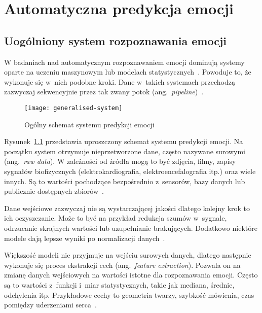 \chapter{Automatyczna predykcja emocji}
\label{ch:automatyczna-predykcja-emocji}

\section{Uogólniony system rozpoznawania emocji}
\label{sec:uogolniony-system-rozpoznawania-emocji}

W badaniach nad automatycznym rozpoznawaniem emocji dominują systemy oparte na uczeniu maszynowym lub modelach statystycznych~\cite{Varghese2015, Dzedzickis2020}.
Powoduje to, że wykonuje się w~nich podobne kroki.
Dane w~takich systemach przechodzą zazwyczaj sekwencyjnie przez tak zwany potok (ang.~\textit{pipeline})~\cite{Geron2019}.

\begin{figure}[h]
    \centering
    \texttt{[image: generalised-system]}
    \caption{Ogólny schemat systemu predykcji emocji}
    \label{fig:generalised-system}
\end{figure}

Rysunek~\ref{fig:generalised-system} przedstawia uproszczony schemat systemu predykcji emocji.
Na początku system otrzymuje nieprzetworzone dane, często nazywane surowymi (ang.~\textit{raw data}).
W zależności od źródła mogą to być zdjęcia, filmy, zapisy sygnałów biofizycznych (elektrokardiografia, elektroencefalografia itp.) oraz wiele innych.
Są to wartości pochodzące bezpośrednio z~sensorów, bazy danych lub publicznie dostępnych zbiorów~\cite{Varghese2015, Russell2020}.

Dane wejściowe zazwyczaj nie są wystarczającej jakości dlatego kolejny krok to ich oczyszczanie.
Może to być na przykład redukcja szumów w~sygnale, odrzucanie skrajnych wartości lub uzupełnianie brakujących.
Dodatkowo niektóre modele dają lepsze wyniki po normalizacji danych~\cite{Geron2019}.

Większość modeli nie przyjmuje na wejściu surowych danych, dlatego następnie wykonuje się proces ekstrakcji cech (ang.~\textit{feature extraction}).
Pozwala on na zmianę danych wejściowych na wartości istotne dla rozpoznawania emocji.
Często są to wartości z~funkcji i~miar statystycznych, takie jak mediana, średnie, odchylenia itp.
Przykładowe cechy to geometria twarzy, szybkość mówienia, czas pomiędzy uderzeniami serca~\cite{Calvo2015}.

